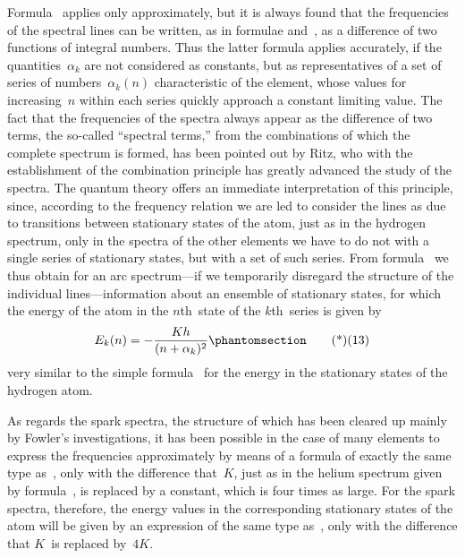 Formula~ applies only approximately, but it is always found
that the frequencies of the spectral lines can be written, as in
formulae  and~, as a difference of two functions of integral
numbers. Thus the latter formula applies accurately, if the
quantities~$\alpha_{k}$ are not considered as constants, but as representatives
of a set of series of numbers~$\alpha_{k}(n)$ characteristic of the element,
whose values for increasing~$n$ within each series quickly approach
a constant limiting value. The fact that the frequencies of the
spectra always appear as the difference of two terms, the so-called
``spectral terms,'' from the combinations of which the complete
spectrum is formed, has been pointed out by Ritz, who with the
establishment of the combination principle has greatly advanced
the study of the spectra. The quantum theory offers an immediate
interpretation of this principle, since, according to the frequency
relation we are led to consider the lines as due to transitions
between stationary states of the atom, just as in the hydrogen
spectrum, only in the spectra of the other elements we have to do
not with a single series of stationary states, but with a set of such
series. From formula~ we thus obtain for an arc spectrum---if
we temporarily disregard the structure of the individual lines---information
about an ensemble of stationary states, for which the
energy of the atom in the $n$th~state of the $k$th~series is given by
\[
E_{k}(n) = -\frac{Kh}{(n + \alpha_{k})^{2}}
\Tag{(13)}
\]
very similar to the simple formula~ for the energy in the stationary
states of the hydrogen atom.

As regards the spark spectra, the structure of which has been
cleared up mainly by Fowler's investigations, it has been possible
in the case of many elements to express the frequencies approximately
by means of a formula of exactly the same type as~,
only with the difference that~$K$, just as in the helium spectrum
given by formula~, is replaced by a constant, which is four times
as large. For the spark spectra, therefore, the energy values in the
corresponding stationary states of the atom will be given by an
expression of the same type as~, only with the difference that
$K$~is replaced by~$4K$.

